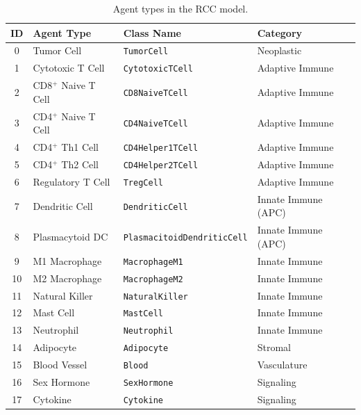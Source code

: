 \begin{table}[H]
\centering
\caption{Agent types in the RCC model.}
\label{tab:agent_types}
\begin{tabular}{@{}clll@{}}
\toprule
\textbf{ID} & \textbf{Agent Type} & \textbf{Class Name} & \textbf{Category} \\
\midrule
0  & Tumor Cell             & \texttt{TumorCell}                   & Neoplastic \\
1  & Cytotoxic T Cell       & \texttt{CytotoxicTCell}              & Adaptive Immune \\
2  & CD8$^+$ Naive T Cell   & \texttt{CD8NaiveTCell}               & Adaptive Immune \\
3  & CD4$^+$ Naive T Cell   & \texttt{CD4NaiveTCell}               & Adaptive Immune \\
4  & CD4$^+$ Th1 Cell       & \texttt{CD4Helper1TCell}             & Adaptive Immune \\
5  & CD4$^+$ Th2 Cell       & \texttt{CD4Helper2TCell}             & Adaptive Immune \\
6  & Regulatory T Cell      & \texttt{TregCell}                    & Adaptive Immune \\
7  & Dendritic Cell         & \texttt{DendriticCell}               & Innate Immune (APC) \\
8  & Plasmacytoid DC        & \texttt{PlasmacitoidDendriticCell}   & Innate Immune (APC) \\
9  & M1 Macrophage          & \texttt{MacrophageM1}                & Innate Immune \\
10 & M2 Macrophage          & \texttt{MacrophageM2}                & Innate Immune \\
11 & Natural Killer         & \texttt{NaturalKiller}               & Innate Immune \\
12 & Mast Cell              & \texttt{MastCell}                    & Innate Immune \\
13 & Neutrophil             & \texttt{Neutrophil}                  & Innate Immune \\
14 & Adipocyte              & \texttt{Adipocyte}                   & Stromal \\
15 & Blood Vessel           & \texttt{Blood}                       & Vasculature \\
16 & Sex Hormone            & \texttt{SexHormone}                  & Signaling \\
17 & Cytokine               & \texttt{Cytokine}                    & Signaling \\
\bottomrule
\end{tabular}
\end{table}



